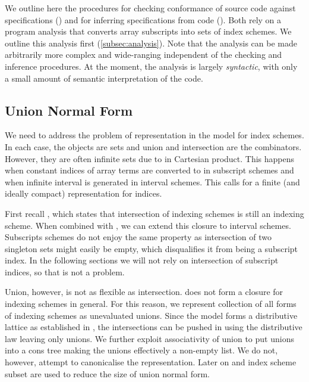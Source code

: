 %
We outline here the procedures for checking conformance
of source code against specifications ()
and for inferring specifications from code ().
Both rely on a program analysis that converts array subscripts
 into sets of index schemes. We outline this analysis
first (\cref{subsec:analysis}). Note that the analysis
can be made arbitrarily more complex and wide-ranging independent
of the checking and inference procedures. At the moment, the analysis
is largely \emph{syntactic}, with only a small amount of
semantic interpretation of the code.

\subsection{Union Normal Form}\label{subsec:union-normal-form}

We need to address the problem of representation in the model for index schemes.
In each case, the objects are sets and union and intersection are the
combinators. However, they are often infinite sets due to \bz{} in Cartesian
product. This happens when constant indices of array terms are converted to
\bz{} in subscript schemes and when infinite interval is generated in interval
schemes. This calls for a finite (and ideally compact) representation for
indices.

First recall , which states that intersection of
indexing schemes is still an indexing scheme. When combined with
, we can extend this closure to interval schemes.
Subscripts schemes do not enjoy the same property as intersection of two
singleton sets might easily be empty, which disqualifies it from being a
subscript index. In the following sections we will not rely on intersection of
subscript indices, so that is not a problem.

Union, however, is not as flexible as intersection.  does
not form a closure for indexing schemes in general. For this reason, we
represent collection of all forms of indexing schemes as unevaluated unions.
Since the model forms a distributive lattice as established in
, the intersections can be pushed in using the
distributive law leaving only unions. We further exploit associativity of union
to put unions into a cons tree making the unions effectively a non-empty list.
We do not, however, attempt to canonicalise the representation. Later on
 and index scheme subset are used to reduce the size of
union normal form.

